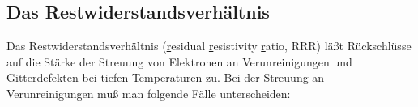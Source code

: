 \subsection{Das Restwiderstandsverhältnis}

Das Restwiderstandsverhältnis (\ul{r}esidual \ul{r}esistivity \ul{r}atio, RRR) läßt Rückschlüsse auf die
Stärke der Streuung von Elektronen an Verunreinigungen und Gitterdefekten bei tiefen Temperaturen
zu. Bei der Streuung an Verunreinigungen muß man folgende Fälle unterscheiden:

\begin{figure}[htp]
	\begin{center}
		\hspace{1em}

\end{center}
\end{figure}
